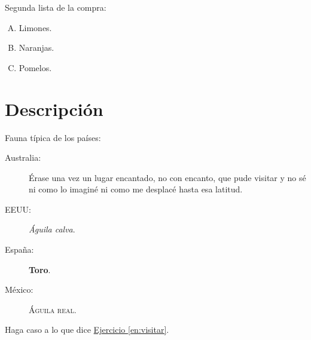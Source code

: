 \documentclass[12pt,
              ]{article}
\begin{document}
Segunda lista de la compra:

\begin{enumerate}[(A)]
  \setcounter{enumi}{\value{mx}} %
\item Limones.
\item Naranjas.
\item Pomelos.
\end{enumerate}

\section{Descripción}

Fauna típica de los países:
\begin{description}
\item[Australia:] Érase una vez un lugar encantado, no con encanto, que pude visitar y no sé ni como lo imaginé ni como me desplacé hasta esa latitud.
\item[EEUU:] \textit{Águila calva}.
\item[España:] \textbf{Toro}.
\item[México:] \textsc{Águila real}.
\end{description}

  Haga caso a lo que dice \hyperref[en:visitar]{Ejercicio
    \ref*{en:visitar}}.
\end{document}
